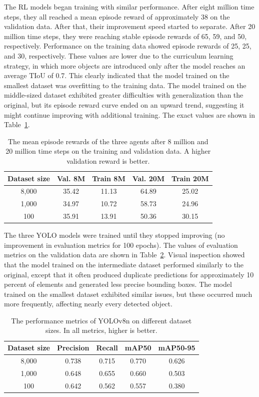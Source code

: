 \documentclass[
  digital,     %
  oneside,     %
  nosansbold,  %
  nocolorbold, %
  lof,         %
  lot,         %
]{fithesis4}
\begin{document}
The RL models began training with similar performance. After eight million time steps, they all reached a mean episode reward of approximately 38 on the validation data. After that, their improvement speed started to separate. After 20 million time steps, they were reaching stable episode rewards of 65, 59, and 50, respectively. Performance on the training data showed episode rewards of 25, 25, and 30, respectively. These values are lower due to the curriculum learning strategy, in which more objects are introduced only after the model reaches an average TIoU of 0.7. This clearly indicated that the model trained on the smallest dataset was overfitting to the training data. The model trained on the middle-sized dataset exhibited greater difficulties with generalization than the original, but its episode reward curve ended on an upward trend, suggesting it might continue improving with additional training. The exact values are shown in Table~\ref{tab:rl_results}.

\begin{table}
    \centering
    \begin{tabular}{c|cccc}
        Dataset size & Val. 8M & Train 8M & Val. 20M & Train 20M \\
         \hline
        8,000 & 35.42 & 11.13 & 64.89 & 25.02 \\
        1,000 & 34.97 & 10.72 & 58.73 & 24.96 \\
        100   & 35.91 & 13.91 & 50.36 & 30.15 \\
    \end{tabular}
    \caption{The mean episode rewards of the three agents after 8 million and 20 million time steps on the training and validation data. A higher validation reward is better.}
    \label{tab:rl_results}
\end{table}

The three YOLO models were trained until they stopped improving (no improvement in evaluation metrics for 100 epochs). The values of evaluation metrics on the validation data are shown in Table~\ref{tab:yolo_results}. Visual inspection showed that the model trained on the intermediate dataset performed similarly to the original, except that it often produced duplicate predictions for approximately 10 percent of elements and generated less precise bounding boxes. The model trained on the smallest dataset exhibited similar issues, but these occurred much more frequently, affecting nearly every detected object.

\begin{table}
    \centering
    \begin{tabular}{c|cccc}
        Dataset size & Precision & Recall & mAP50 & mAP50-95 \\
         \hline
        8,000 & 0.738 & 0.715 & 0.770 & 0.626 \\
        1,000 & 0.648 & 0.655 & 0.660 & 0.503 \\
        100   & 0.642 & 0.562 & 0.557 & 0.380 \\
    \end{tabular}
    \caption{The performance metrics of YOLOv8n on different dataset sizes. In all metrics, higher is better.}
    \label{tab:yolo_results}
\end{table}
\end{document}
